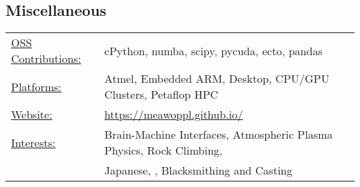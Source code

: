 \documentclass{res}
\begin{document}
\begin{resume}
\section{Miscellaneous}
   \begin{tabular}{l p{5.5in}}
    \underline{OSS Contributions:} & cPython, numba, scipy, pycuda, ecto, pandas  \\
    \underline{Platforms:}  & Atmel, Embedded ARM, Desktop, CPU/GPU Clusters, Petaflop HPC \\
    \underline{Website:}    & \href{https://meawoppl.github.io/}{https://meawoppl.github.io/}  \\
    \underline{Interests:}  & Brain-Machine Interfaces, Atmospheric Plasma Physics, Rock Climbing, \\
                            & Japanese, , Blacksmithing and Casting
 \end{tabular}

\end{resume}
\end{document}
